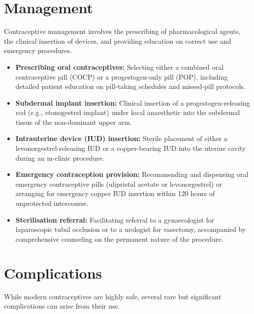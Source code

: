 \section*{Management}
Contraceptive management involves the prescribing of pharmacological agents, the clinical insertion of devices, and providing education on correct use and emergency procedures.

\begin{itemize}
    \item \textbf{Prescribing oral contraceptives:} Selecting either a combined oral contraceptive pill (COCP) or a progestogen-only pill (POP), including detailed patient education on pill-taking schedules and missed-pill protocols.
    \item \textbf{Subdermal implant insertion:} Clinical insertion of a progestogen-releasing rod (e.g., etonogestrel implant) under local anaesthetic into the subdermal tissue of the non-dominant upper arm.
    \item \textbf{Intrauterine device (IUD) insertion:} Sterile placement of either a levonorgestrel-releasing IUD or a copper-bearing IUD into the uterine cavity during an in-clinic procedure.
    \item \textbf{Emergency contraception provision:} Recommending and dispensing oral emergency contraceptive pills (ulipristal acetate or levonorgestrel) or arranging for emergency copper IUD insertion within 120 hours of unprotected intercourse.
    \item \textbf{Sterilisation referral:} Facilitating referral to a gynaecologist for laparoscopic tubal occlusion or to a urologist for vasectomy, accompanied by comprehensive counseling on the permanent nature of the procedure.
\end{itemize}

\section*{Complications}
While modern contraceptives are highly safe, several rare but significant complications can arise from their use.

